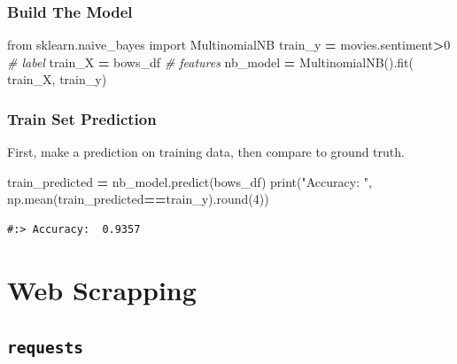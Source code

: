 \documentclass[
]{book}
\newenvironment{Shaded}{\begin{snugshade}}{\end{snugshade}}
\newcommand{\BuiltInTok}[1]{#1}
\newcommand{\CommentTok}[1]{\textcolor[rgb]{0.37,0.37,0.37}{\textit{#1}}}
\newcommand{\DecValTok}[1]{\textcolor[rgb]{0.06,0.06,0.06}{#1}}
\newcommand{\ImportTok}[1]{#1}
\newcommand{\NormalTok}[1]{#1}
\newcommand{\OperatorTok}[1]{\textcolor[rgb]{0.43,0.43,0.43}{\textbf{#1}}}
\newcommand{\StringTok}[1]{\textcolor[rgb]{0.5,0.5,0.5}{#1}}
\begin{document}
\hypertarget{build-the-model}{%
\subsection{Build The Model}\label{build-the-model}}

\begin{Shaded}
\begin{Highlighting}[]
\ImportTok{from}\NormalTok{ sklearn.naive_bayes }\ImportTok{import}\NormalTok{ MultinomialNB}
\NormalTok{train_y  }\OperatorTok{=}\NormalTok{ movies.sentiment}\OperatorTok{>}\DecValTok{0}   \CommentTok{# label}
\NormalTok{train_X  }\OperatorTok{=}\NormalTok{ bows_df              }\CommentTok{# features}
\NormalTok{nb_model }\OperatorTok{=}\NormalTok{ MultinomialNB().fit( train_X, train_y)}
\end{Highlighting}
\end{Shaded}

\hypertarget{train-set-prediction}{%
\subsection{Train Set Prediction}\label{train-set-prediction}}

First, make a prediction on training data, then compare to ground truth.

\begin{Shaded}
\begin{Highlighting}[]
\NormalTok{train_predicted }\OperatorTok{=}\NormalTok{ nb_model.predict(bows_df)}
\BuiltInTok{print}\NormalTok{(}\StringTok{"Accuracy: "}\NormalTok{, np.mean(train_predicted}\OperatorTok{==}\NormalTok{train_y).}\BuiltInTok{round}\NormalTok{(}\DecValTok{4}\NormalTok{))}
\end{Highlighting}
\end{Shaded}

\begin{verbatim}
#:> Accuracy:  0.9357
\end{verbatim}

\hypertarget{web-scrapping}{%
\chapter{Web Scrapping}\label{web-scrapping}}

\hypertarget{requests}{%
\section{\texorpdfstring{\texttt{requests}}{requests}}\label{requests}}
\end{document}
